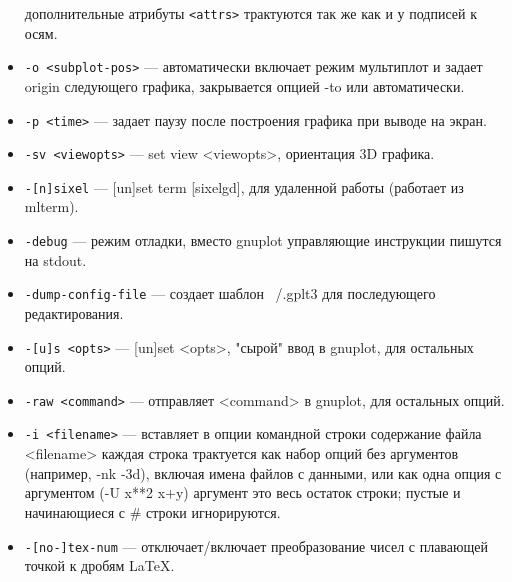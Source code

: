 \documentclass[12pt]{article}
\begin{document}
\begin{itemize}
   дополнительные атрибуты \verb'<attrs>' трактуются так же как и у подписей к осям.
\item \verb'-o <subplot-pos>' --- автоматически включает режим мультиплот и задает origin 
   следующего графика, закрывается опцией -to или автоматически.
\item \verb'-p <time>' --- задает паузу после построения графика при выводе на экран.
\item \verb'-sv <viewopts>' --- set view <viewopts>, ориентация 3D графика.
\item \verb'-[n]sixel' --- [un]set term [sixelgd], для удаленной работы (работает из mlterm).
\item \verb'-debug' --- режим отладки, вместо gnuplot управляющие инструкции пишутся на stdout.
\item \verb'-dump-config-file' --- создает шаблон ~/.gplt3 для последующего редактирования.
\item \verb'-[u]s <opts>' --- [un]set <opts>, "сырой" ввод в gnuplot, для остальных опций.
\item \verb'-raw <command>' --- отправляет <command> в gnuplot, для остальных опций.
\item \verb'-i <filename>' --- вставляет в опции командной строки содержание файла <filename>
   каждая строка трактуется как набор опций без аргументов (например, -nk -3d), 
   включая имена файлов с данными, или как одна опция с аргументом (-U x**2 x+y)
   аргумент это весь остаток строки; пустые и начинающиеся с \# строки игнорируются.
\item \verb'-[no-]tex-num' --- отключает/включает преобразование чисел с плавающей точкой к дробям \LaTeX.
\end{itemize}

\newpage
\end{document}
